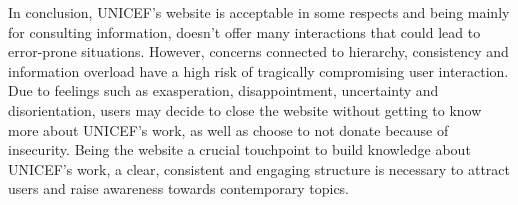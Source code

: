 In conclusion, UNICEF’s website is acceptable in some respects and being mainly for consulting information, doesn’t offer many interactions that could lead to error-prone situations. However, concerns connected to hierarchy, consistency and information overload have a high risk of tragically compromising user interaction. Due to feelings such as exasperation, disappointment, uncertainty and disorientation, users may decide to close the website without getting to know more about UNICEF’s work, as well as choose to not donate because of insecurity. Being the website a crucial touchpoint to build knowledge about UNICEF’s work, a clear, consistent and engaging structure is necessary to attract users and raise awareness towards contemporary topics.


